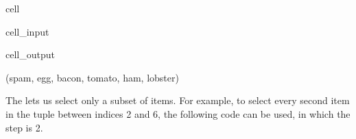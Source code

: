 \documentclass[letterpaper,10pt,english]{jupyterBook}
\begin{document}
\begin{sphinxuseclass}{cell}\begin{sphinxVerbatimInput}

\begin{sphinxuseclass}{cell_input}
\begin{sphinxVerbatim}[commandchars=\\\{\}]
\PYG{p}{[}\PYG{p}{]}
\end{sphinxVerbatim}

\end{sphinxuseclass}\end{sphinxVerbatimInput}
\begin{sphinxVerbatimOutput}

\begin{sphinxuseclass}{cell_output}
\begin{sphinxVerbatim}[commandchars=\\\{\}]
(\PYGZsq{}spam\PYGZsq{}, \PYGZsq{}egg\PYGZsq{}, \PYGZsq{}bacon\PYGZsq{}, \PYGZsq{}tomato\PYGZsq{}, \PYGZsq{}ham\PYGZsq{}, \PYGZsq{}lobster\PYGZsq{})
\end{sphinxVerbatim}

\end{sphinxuseclass}\end{sphinxVerbatimOutput}

\end{sphinxuseclass}
\sphinxAtStartPar
The  lets us select only a subset of items. For example, to select every second item in the tuple between indices 2 and 6, the following code can be used, in which the step is 2.
\end{document}
